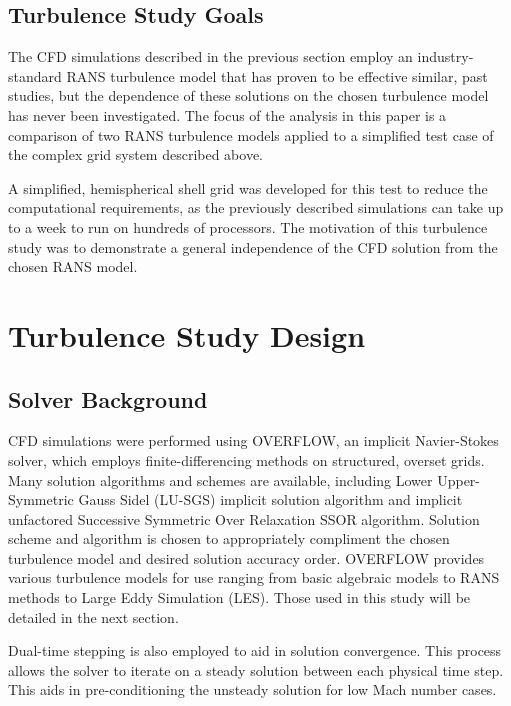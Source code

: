 \documentclass[]{aiaa-tc}%
\begin{document}
\subsection{Turbulence Study Goals}

The CFD simulations described in the previous section employ an industry-standard RANS turbulence model that has proven to be effective similar, past studies, but the dependence of these solutions on the chosen turbulence model has never been investigated.  The focus of the analysis in this paper is a comparison of two RANS turbulence models applied to a simplified test case of the complex grid system described above.

A simplified, hemispherical shell grid was developed for this test to reduce the computational requirements, as the previously described simulations can take up to a week to run on hundreds of processors.  The motivation of this turbulence study was to demonstrate a general independence of the CFD solution from the chosen RANS model.

\section{Turbulence Study Design}


\subsection{Solver Background}

CFD simulations were performed using OVERFLOW, an implicit Navier-Stokes solver, which employs finite-differencing methods on structured, overset grids.\cite{overflow}  Many solution algorithms and schemes are available, including Lower Upper-Symmetric Gauss Sidel (LU-SGS) implicit solution algorithm and implicit unfactored Successive Symmetric Over Relaxation SSOR algorithm.  Solution scheme and algorithm is chosen to appropriately compliment the chosen turbulence model and desired solution accuracy order.  OVERFLOW provides various turbulence models for use ranging from basic algebraic models to RANS methods to Large Eddy Simulation (LES).  Those used in this study will be detailed in the next section.

Dual-time stepping is also employed to aid in solution convergence.\cite{dualtime}  This process allows the solver to iterate on a steady solution between each physical time step.  This aids in pre-conditioning the unsteady solution for low Mach number cases.
\end{document}

